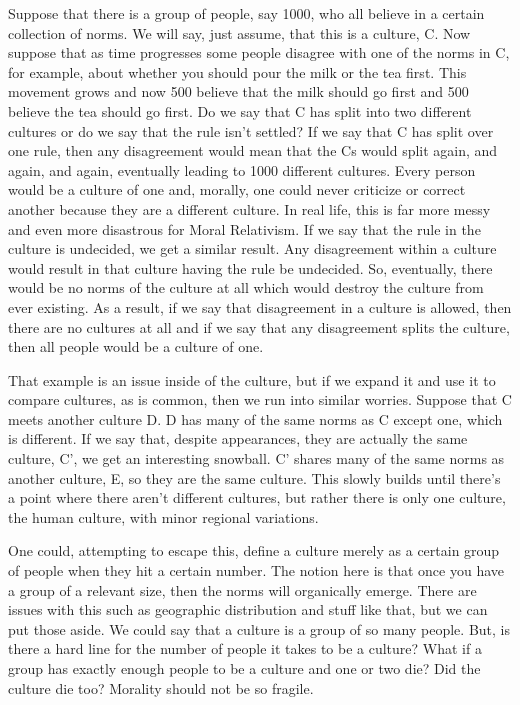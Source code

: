 Suppose that there is a group of people, say 1000, who all believe in a certain collection of norms. We will say, just assume, that this is a culture, C. Now suppose that as time progresses some people disagree with one of the norms in C, for example, about whether you should pour the milk or the tea first. This movement grows and now 500 believe that the milk should go first and 500 believe the tea should go first. Do we say that C has split into two different cultures or do we say that the rule isn’t settled? If we say that C has split over one rule, then any disagreement would mean that the Cs would split again, and again, and again, eventually leading to 1000 different cultures. Every person would be a culture of one and, morally, one could never criticize or correct another because they are a different culture.  In real life, this is far more messy and even more disastrous for Moral Relativism.  If we say that the rule in the culture is undecided, we get a similar result. Any disagreement within a culture would result in that culture having the rule be undecided. So, eventually, there would be no norms of the culture at all which would destroy the culture from ever existing. As a result, if we say that disagreement in a culture is allowed, then there are no cultures at all and if we say that any disagreement splits the culture, then all people would be a culture of one. 

That example is an issue inside of the culture, but if we expand it and use it to compare cultures, as is common, then we run into similar worries. Suppose that C meets another culture D. D has many of the same norms as C except one, which is different. If we say that, despite appearances, they are actually the same culture, C’, we get an interesting snowball. C’ shares many of the same norms as another culture, E, so they are the same culture. This slowly builds until there’s a point where there aren’t different cultures, but rather there is only one culture, the human culture, with minor regional variations.

One could, attempting to escape this, define a culture merely as a certain group of people when they hit a certain number. The notion here is that once you have a group of a relevant size, then the norms will organically emerge. There are issues with this such as geographic distribution and stuff like that, but we can put those aside.  We could say that a culture is a group of so many people. But, is there a hard line for the number of people it takes to be a culture? What if a group has exactly enough people to be a culture and one or two die? Did the culture die too? Morality should not be so fragile.

